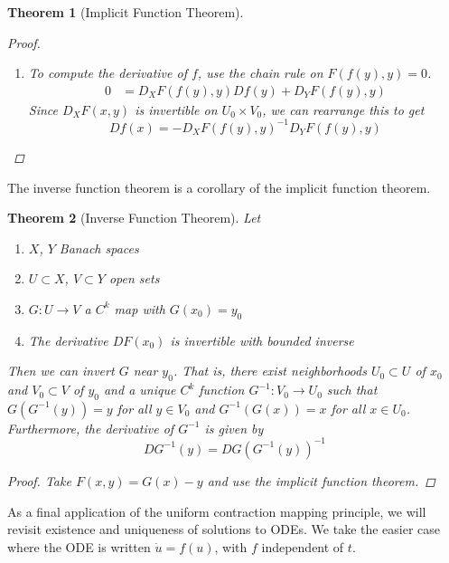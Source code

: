 \documentclass[12pt]{amsart}         %
\newtheorem{theorem}{Theorem}[section]
\theoremstyle{remark}
\begin{document}
\begin{theorem}[Implicit Function Theorem]
\begin{proof}
\begin{enumerate}
\item To compute the derivative of $f$, use the chain rule on $F(f(y), y) = 0$.
\begin{align*}
0 &= D_X F(f(y),y)Df(y) + D_Y F(f(y),y)
\end{align*}
Since $D_X F(x, y)$ is invertible on $U_0 \times V_0$, we can rearrange this to get
\[
Df(x) = -D_X F(f(y),y)^{-1} D_Y F(f(y),y)
\]
\end{enumerate}
\end{proof}
\end{theorem}

The inverse function theorem is a corollary of the implicit function theorem.

\begin{theorem}[Inverse Function Theorem]
Let
\begin{enumerate}
\item $X$, $Y$ Banach spaces
\item $U \subset X$, $V \subset Y$ open sets
\item $G: U \rightarrow V$ a $C^k$ map with $G(x_0) = y_0$
\item The derivative $D F(x_0)$ is invertible with bounded inverse
\end{enumerate}
Then we can invert $G$ near $y_0$. That is, there exist neighborhoods $U_0 \subset U$ of $x_0$ and $V_0 \subset V$ of $y_0$ and a unique $C^k$ function $G^{-1}: V_0 \rightarrow U_0$ such that $G(G^{-1}(y)) = y$ for all $y \in V_0$ and $G^{-1}(G(x)) = x$ for all $x \in U_0$. Furthermore, the derivative of $G^{-1}$ is given by
\[
DG^{-1}(y) = D G( G^{-1}(y) )^{-1}
\]

\begin{proof}
Take $F(x, y) = G(x) - y$ and use the implicit function theorem.
\end{proof}
\end{theorem}

As a final application of the uniform contraction mapping principle, we will revisit existence and uniqueness of solutions to ODEs. We take the easier case where the ODE is written $\dot{u} = f(u)$, with $f$ independent of $t$.
\end{document}
